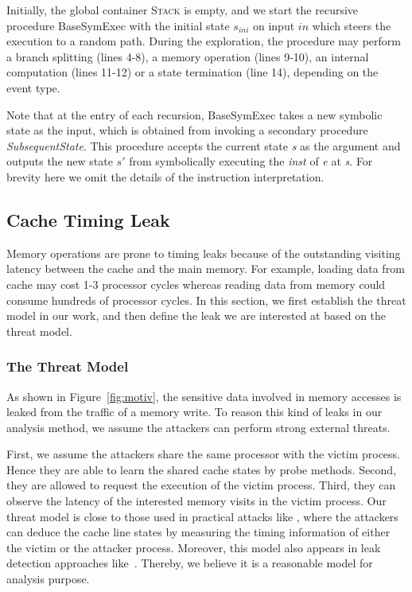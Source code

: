 \documentclass[sigconf]{acmart}
\newcommand{\SymExec}{\textsf{BaseSymExec} }
\begin{document}
Initially, the global container \textsc{Stack} is empty, and we start the
recursive procedure \SymExec with the initial state $\mathit{s_{ini}}$ 
on input $\mathit{in}$ which steers the execution to a random path. During 
the exploration, the procedure may perform a branch splitting (lines 4-8), 
a memory operation (lines 9-10), an internal computation (lines 11-12) or 
a state termination (line 14), depending on the event type.

Note that at the entry of each recursion, \SymExec takes a new symbolic 
state as the input, which is obtained from invoking a secondary procedure 
\textit{SubsequentState}. This procedure accepts the current state 
\textit{s} as the argument and outputs the new state $s'$ from symbolically 
executing the \textit{inst} of \textit{e} at \textit{s}. For brevity here 
we omit the details of the instruction interpretation.



\subsection{Cache Timing Leak}
\label{sec:leak}

Memory operations are prone to timing leaks because of the outstanding visiting
latency between the cache and the main memory. For example, loading data from cache 
may cost 1-3 processor cycles whereas reading data from memory could consume hundreds 
of processor cycles. In this section, we first establish the threat model in our work, 
and then define the leak we are interested at based on the threat model.


\subsubsection{The Threat Model}
As shown in Figure~\ref{fig:motiv}, the sensitive data involved in memory accesses 
is leaked from the traffic of a memory write. To reason this kind of leaks in our 
analysis method, we assume the attackers can perform strong external threats. 

First, we assume the attackers share the same processor with the victim process. 
Hence they are able to learn the shared cache states by probe methods. Second, they 
are allowed to request the execution of the victim process. Third, they can 
observe the latency of the interested memory visits in the victim process. 
%
Our threat model is close to those used in practical attacks like
\cite{OsvikST06,YaromF14,DisselkoenKPT17}, where the attackers can deduce the 
cache line states by measuring the timing information of either the victim 
or the attacker process. Moreover, this model also appears in leak detection approaches 
like~\cite{WangWLZW17,DoychevK17,WichelmannMES18,BrotzmanLZTK2018}. Thereby, we 
believe it is a reasonable model for analysis purpose.
\end{document}
